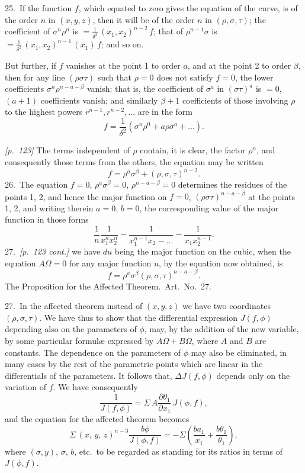 \documentclass[11pt,a4paper]{article}
\theoremstyle{plain}
\theoremstyle{definition}
\theoremstyle{remark}
\begin{document}
25.\ If the function $f$, which equated to zero gives the equation of the curve, is of the order $n$ in $(x, y, z)$, then it will be of the order $n$ in $(\rho, \sigma, \tau)$; the coefficient of $\sigma^n \rho^n$ is $= \frac{1}{\delta^2}\,(x_1, x_2)^{n-2}\,f$; that of $\rho^{n-1}\sigma$ is $= \frac{1}{\delta^2}\,(x_1, x_2)^{n-1}\,(x_1)\,f$; and so on.

But further, if $f$ vanishes at the point 1 to order $a$, and at the point 2 to order $\beta$, then for any line $(\rho \sigma \tau)$ such that $\rho = 0$ does not satisfy $f = 0$, the lower coefficients $\sigma^n \rho^{n-a-\beta}$ vanish: that is, the coefficient of $\sigma^a$ in $(\sigma \tau)^a$ is $= 0$, $(a + 1)$ coefficients vanish; and similarly $\beta + 1$ coefficients of those involving $\rho$ to the highest powers $r^{n-1}, r^{n-2}, ...$ are in the form
\[
f = \frac{1}{\delta^2}(\sigma^n \rho^0 + a \rho \sigma^a + ...).
\]

\noindent\textit{[p.~123]} The terms independent of $\rho$ contain, it is clear, the factor $\rho^n$, and consequently those terms from the others, the equation may be written
\[
f = \rho^a \sigma^\beta + (\rho, \sigma, \tau)^{n - 2}.
\]
26.\ The equation $f = 0$, $\rho^a \sigma^\beta = 0$, $\rho^{n-a-\beta} = 0$ determines the residues of the points 1, 2, and hence the major function on $f = 0$, $(\rho \sigma \tau)^{n-a-\beta}$ at the points 1, 2, and writing therein $a = 0$, $b = 0$, the corresponding value of the major function in those forms
\[
\frac{1}{n}\frac{1}{x_1^n x_2^n} - \frac{1}{x_1^{n-1} x_2 - ...} - \frac{1}{x_1 x_2^{n-1}}.
\]
27.\ \textit{[p.~123 cont.]} we have $du$ being the major function on the cubic, when the equation $A\Omega = 0$ for any major function $u$, by the equation now obtained, is
\[
f = \rho^a \sigma^\beta (\rho, \sigma, \tau)^{n - a - \beta}.
\]
The Proposition for the Affected Theorem.\ Art.\ No.~27.

27.\ In the affected theorem instead of $(x, y, z)$ we have two coordinates $(\rho, \sigma, \tau)$. We have thus to show that the differential expression $J(f, \phi)$ depending also on the parameters of $\phi$, may, by the addition of the new variable, by some particular formul\ae{} expressed by $A\Omega + B\Omega$, where $A$ and $B$ are constants. The dependence on the parameters of $\phi$ may also be eliminated, in many cases by the rest of the parametric points which are linear in the differentials of the parameters. It follows that, $\Delta J(f, \phi)$ depends only on the variation of $f$. We have consequently
\[
\frac{1}{J(f, \phi)} = \Sigma\,A\frac{\partial \theta_1}{\partial x_1}\,J(\phi, f),
\]
and the equation for the affected theorem becomes
\[
\Sigma\,(x,\,y,\,z)^{n-3}\frac{b\phi}{J(\phi, f)} = -\Sigma\left(\frac{ba_1}{x_1} + \frac{b\theta_1}{\theta_1}\right),
\]
where $(\sigma, y)$, $\sigma$, $b$, etc.\ to be regarded as standing for its ratios in terms of $J(\phi, f)$.
\end{document}
